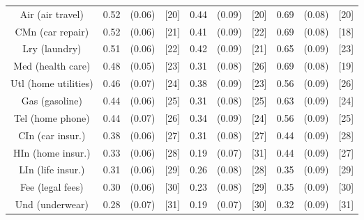 \documentclass[a4paper,10pt]{article}
\begin{document}
\begin{tabular}{cccccccccc}
Air (air travel)&0.52&(0.06)&[20] & 0.44&(0.09)&[20] & 0.69 & (0.08) & [20] \\
CMn (car repair)&0.52&(0.06)&[21] & 0.41&(0.09)&[22] & 0.69 & (0.08) & [18] \\
Lry (laundry)&0.51&(0.06)&[22] & 0.42&(0.09)&[21] & 0.65 & (0.09) & [23] \\
Med (health care)&0.48&(0.05)&[23] & 0.31&(0.08)&[26] & 0.69 & (0.08) & [19] \\
Utl (home utilities)&0.46&(0.07)&[24] & 0.38&(0.09)&[23] & 0.56 & (0.09) & [26]\\
Gas (gasoline)&0.44&(0.06)&[25] & 0.31&(0.08)&[25] & 0.63 & (0.09) & [24] \\
Tel (home phone)&0.44&(0.07)&[26] & 0.34&(0.09)&[24] & 0.56 & (0.09) & [25] \\
CIn (car insur.)&0.38&(0.06)&[27] & 0.31&(0.08)&[27] & 0.44 & (0.09) & [28] \\
HIn (home insur.)&0.33&(0.06)&[28] & 0.19&(0.07)&[31] & 0.44 & (0.09) & [27] \\
LIn (life insur.)&0.31&(0.06)&[29] & 0.26&(0.08)&[28] & 0.35 & (0.09) & [29] \\
Fee (legal fees)&0.30&(0.06)&[30] & 0.23&(0.08)&[29] & 0.35 & (0.09) & [30] \\
Und (underwear)&0.28&(0.07)&[31] & 0.19&(0.07)&[30] & 0.32 & (0.09) & [31] \\
\hline \hline
\end{tabular}
\end{document}
